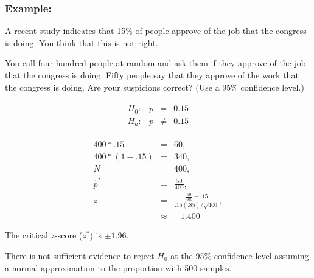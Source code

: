 \begin{frame}
  \frametitle{Example: }

  \vspace*{-2em}
  A recent study indicates that 15\% of people approve of the job that
  the congress is doing. You think that this is not right. 

  You call four-hundred people at random and ask them if they approve
  of the job that the congress is doing. Fifty people say that they
  approve of the work that the congress is doing. Are your suspicions
  correct?  (Use a 95\% confidence level.)

  \vfill

  {
    \begin{eqnarray*}
      \begin{array}{lrcl}
        H_0: & p & = & 0.15 \\
        H_a: & p & \neq & 0.15
      \end{array}
    \end{eqnarray*}
  }

  {
    \begin{eqnarray*}
      400*.15     & = & 60, \\
      400*(1-.15) & = & 340, \\
      N & = & 400, \\
      \hat{p}^* & = & \frac{50}{400}, \\
      z & = & \frac{\frac{50}{400}-.15}{.15(.85)/\sqrt{400}}, \\
      & \approx & -1.400
    \end{eqnarray*}
  }
  

  {
    The critical $z$-score ($z^*$) is $\pm 1.96$.
  }

  {

    {\color{red} 

      There is not sufficient evidence to reject $H_0$ at the 95\%
      confidence level assuming a normal approximation to the
      proportion with 500 samples.  

    }

  }

  \vfill
  
\end{frame}





